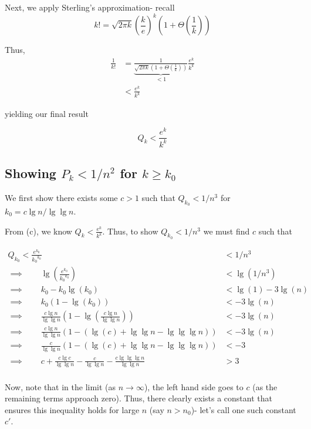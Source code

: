\documentclass[paper=a4, fontsize=11pt]{scrartcl} %
\numberwithin{equation}{section} %
\numberwithin{figure}{section} %
\numberwithin{table}{section} %
\begin{document}
Next, we apply Sterling's approximation- recall
\[k! = \sqrt{2 \pi k} \left(\frac{k}{e}\right)^k \left(1 + \Theta\left(\frac{1}{k}\right)\right)\]

Thus,
\begin{align*}
\frac{1}{k!} &= \underbrace{\frac{1}{\sqrt{2 \pi k}\left(1 + \Theta\left(\frac{1}{k}\right)\right)}}_{<1} \frac{e^k}{k^k}\\
	&< \frac{e^k}{k^k}
\end{align*}

yielding our final result

\[Q_k < \frac{e^k}{k^k}\]

\subsection{Showing $P_k < 1/n^2$ for $k \geq k_0$}

We first show there exists some $c > 1$ such that $Q_{k_0} < 1/n^3$ for $k_0 = c \lg n / \lg \lg n$.

From (c), we know $Q_k < \frac{e^k}{k^k}$. Thus, to show $Q_{k_0} < 1/n^3$ we must find $c$ such that

\begin{align*}
Q_{k_0} < \frac{e^{k_0}}{{k_0}^{k_0}} &< 1/ n^3 \\
\implies{} \qquad{} \lg \left(\frac{e^{k_0}}{{k_0}^{k_0}}\right) &< \lg \left(1/ n^3 \right) \\
\implies{} \qquad{} k_0 - k_0 \lg (k_0) &< \lg(1) - 3\lg (n)\\
\implies{} \qquad{} k_0(1 - \lg (k_0)) &< -3\lg (n)\\
\implies{} \qquad{} \frac{c \lg n}{\lg \lg n}\left(1 - \lg \left(\frac{c \lg n}{\lg \lg n}\right)\right) &< -3\lg (n)\\
\implies{} \qquad{} \frac{c \lg n}{\lg \lg n}(1 - \left(\lg (c) +\lg \lg n - \lg \lg \lg n\right)) &< -3\lg (n)\\
\implies{} \qquad{} \frac{c}{\lg \lg n}(1 - (\lg (c) +\lg \lg n - \lg \lg \lg n)) &< -3\\
\implies{} \qquad{} c + \frac{c \lg c}{\lg \lg n}  - \frac{c}{\lg \lg n} - \frac{c  \lg \lg \lg n}{\lg \lg n} &> 3\\
\end{align*}

Now, note that in the limit (as $n \to \infty$), the left hand side goes to $c$ (as the remaining terms approach zero). Thus, there clearly exists a constant that ensures this inequality holds for large $n$ (say $n > n_0$)- let's call one such constant $c'$. 
\end{document}
